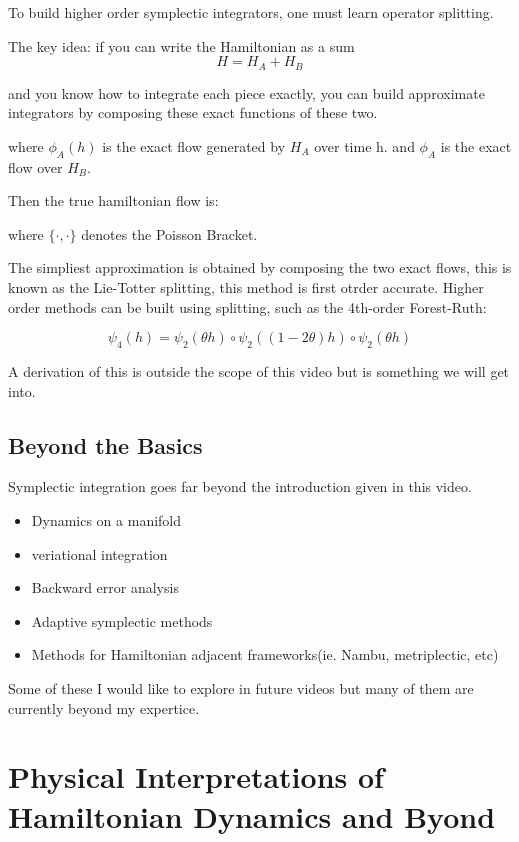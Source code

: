 To build higher order symplectic integrators, one must learn operator splitting.

The key idea: if you can write the Hamiltonian as a sum
\[
H=H_A + H_B
\]

and you know how to integrate each piece exactly, you can build approximate integrators by composing these exact functions of these two.

where $\phi_A(h)$ is the exact flow generated by $H_A$ over time h.
and $\phi_A$ is the exact flow over $H_B$.

Then the true hamiltonian flow is:







where $\{\cdot, \cdot \}$ denotes the Poisson Bracket.

The simpliest approximation is obtained by composing the two exact flows, this is known as the Lie-Totter splitting, this method is first otrder accurate. Higher order methods can be built using splitting, such as the 4th-order Forest-Ruth:

\[
\psi_4(h)=\psi_2(\theta h) \circ \psi_2((1-2 \theta)h) \circ \psi_2(\theta h)
\]

A derivation of this is outside the scope of this video but is something we will get into.

\subsection{Beyond the Basics}
Symplectic integration goes far beyond the introduction given in this video.

\begin{itemize}
\item Dynamics on a manifold
\item veriational integration
\item Backward error analysis
\item Adaptive symplectic methods
  \item Methods for Hamiltonian adjacent frameworks(ie. Nambu, metriplectic, etc)
\end{itemize}

Some of these I would like to explore in future videos but many of them are currently beyond my expertice.

\section{Physical Interpretations of Hamiltonian Dynamics and Byond}

